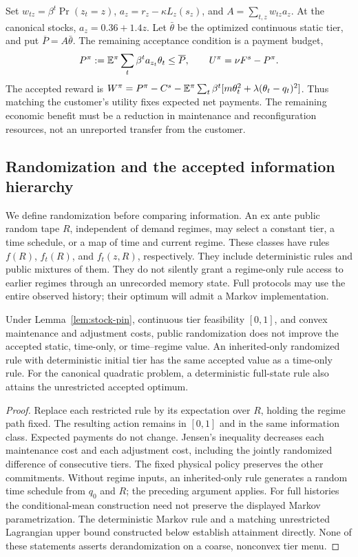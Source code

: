 Set $w_{tz}=\beta^t\Pr(z_t=z)$, $a_z=r_z-\kappa L_z(s_z)$, and $A=\sum_{t,z}w_{tz}a_z$. At the canonical stocks, $a_z=0.36+1.4z$. Let $\bar\theta$ be the optimized continuous static tier, and put $\overline P=A\bar\theta$. The remaining acceptance condition is a payment budget,
\begin{equation}\label{eq:accepted-payment}
 P^\pi:=\mathbb E^\pi\sum_t\beta^t a_{z_t}\theta_t\leq\overline P,
 \qquad U^\pi=\nu F^s-P^\pi.
\end{equation}
The accepted reward is $W^\pi=P^\pi-C^s-\mathbb E^\pi\sum_t\beta^t[m\theta_t^2+\lambda(\theta_t-q_t)^2]$. Thus matching the customer's utility fixes expected net payments. The remaining economic benefit must be a reduction in maintenance and reconfiguration resources, not an unreported transfer from the customer.

\subsection{Randomization and the accepted information hierarchy}
We define randomization before comparing information. An ex ante public random tape $R$, independent of demand regimes, may select a constant tier, a time schedule, or a map of time and current regime. These classes have rules $f(R)$, $f_t(R)$, and $f_t(z,R)$, respectively. They include deterministic rules and public mixtures of them. They do not silently grant a regime-only rule access to earlier regimes through an unrecorded memory state. Full protocols may use the entire observed history; their optimum will admit a Markov implementation.

\begin{proposition}\label{prop:accepted-jensen}
Under Lemma~\ref{lem:stock-pin}, continuous tier feasibility $[0,1]$, and convex maintenance and adjustment costs, public randomization does not improve the accepted static, time-only, or time--regime value. An inherited-only randomized rule with deterministic initial tier has the same accepted value as a time-only rule. For the canonical quadratic problem, a deterministic full-state rule also attains the unrestricted accepted optimum.
\end{proposition}
\begin{proof}
Replace each restricted rule by its expectation over $R$, holding the regime path fixed. The resulting action remains in $[0,1]$ and in the same information class. Expected payments do not change. Jensen's inequality decreases each maintenance cost and each adjustment cost, including the jointly randomized difference of consecutive tiers. The fixed physical policy preserves the other commitments. Without regime inputs, an inherited-only rule generates a random time schedule from $q_0$ and $R$; the preceding argument applies. For full histories the conditional-mean construction need not preserve the displayed Markov parametrization. The deterministic Markov rule and a matching unrestricted Lagrangian upper bound constructed below establish attainment directly. None of these statements asserts derandomization on a coarse, nonconvex tier menu.
\end{proof}

